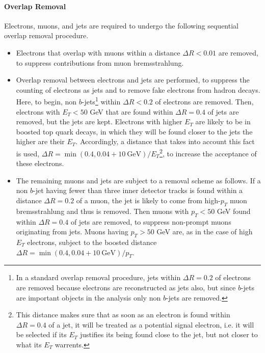\paragraph{Overlap Removal} Electrons, muons, and jets are required to undergo
the following sequential overlap removal procedure.

\begin{itemize}[label=]

	\item Electrons that overlap with muons within a distance $\Delta R < 0.01$ are
	      removed, to suppress contributions from muon bremsstrahlung.

	\item Overlap removal between electrons and jets are performed, to suppress the
	      counting of electrons as jets and to remove fake electrons from hadron decays.
	      Here, to begin, non $b$-jets\footnote{In a standard overlap removal procedure,
		      jets within $\Delta R= 0.2$ of electrons are removed because electrons are
		      reconstructed as jets also, but since $b$-jets are important objects in the
		      analysis only non $b$-jets are removed.} within $\Delta R < 0.2$ of electrons
	      are removed. Then, electrons with $E_T < 50$ GeV that are found within $\Delta
		      R = 0.4$ of jets are removed, but the jets are kept. Electrons with higher
	      $E_T$ are likely to be in boosted top quark decays, in which they will be found
	      closer to the jets the higher are their $E_T$. Accordingly, a distance that
	      takes into account this fact is used, $\Delta R = \min(0.4, 0.04+10~\text{GeV})
		      / E_T$\footnote{This distance makes sure that as soon as an electron is found
		      within $\Delta R = 0.4$ of a jet, it will be treated as a potential signal
		      electron, i.e. it will be selected if its $E_T$ justifies its being found close
		      to the jet, but not closer to what its $E_T$ warrents.}, to increase the
	      acceptance of these electrons.

	\item The remaining muons and jets are subject to a removal scheme as follows.
	      If a non $b$-jet having fewer than three inner detector tracks is found within
	      a distance $\Delta R = 0.2$ of a muon, the jet is likely to come from
	      high-$p_T$ muon bremsstrahlung and thus is removed. Then muons with $p_T < 50$
	      GeV found within $\Delta R = 0.4$ of jets are removed, to suppress non-prompt
	      muons originating from jets. Muons having $p_T > 50$ GeV are, as in the case of
	      high $E_T$ electrons, subject to the boosted distance $\Delta R = \min(0.4,
		      0.04+10~\text{GeV}) / p_T$.

\end{itemize}


